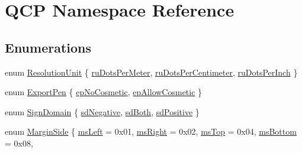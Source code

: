 \hypertarget{namespace_q_c_p}{}\section{Q\+CP Namespace Reference}
\label{namespace_q_c_p}
\subsection*{Enumerations}
\begin{DoxyCompactItemize}
\item 
enum \mbox{\hyperlink{namespace_q_c_p_a715d46153da230990aa887d0f0602452}{Resolution\+Unit}} \{ \mbox{\hyperlink{namespace_q_c_p_a715d46153da230990aa887d0f0602452a707d005dea5c4ab694e4270d9c6094e8}{ru\+Dots\+Per\+Meter}}, 
\mbox{\hyperlink{namespace_q_c_p_a715d46153da230990aa887d0f0602452a4224e01f49b331489ad8cb12b619b229}{ru\+Dots\+Per\+Centimeter}}, 
\mbox{\hyperlink{namespace_q_c_p_a715d46153da230990aa887d0f0602452affb887d8efe79c39a1aca2acd7002afc}{ru\+Dots\+Per\+Inch}}
 \}
\item 
enum \mbox{\hyperlink{namespace_q_c_p_a17844f19e1019693a953e1eb93536d2f}{Export\+Pen}} \{ \mbox{\hyperlink{namespace_q_c_p_a17844f19e1019693a953e1eb93536d2faae8fcfaafee234ce18558afef83f6a78}{ep\+No\+Cosmetic}}, 
\mbox{\hyperlink{namespace_q_c_p_a17844f19e1019693a953e1eb93536d2fa50d3657dba3fb90560b93a823cb0a6e8}{ep\+Allow\+Cosmetic}}
 \}
\item 
enum \mbox{\hyperlink{namespace_q_c_p_afd50e7cf431af385614987d8553ff8a9}{Sign\+Domain}} \{ \mbox{\hyperlink{namespace_q_c_p_afd50e7cf431af385614987d8553ff8a9a2d18af0bc58f6528d1e82ce699fe4829}{sd\+Negative}}, 
\mbox{\hyperlink{namespace_q_c_p_afd50e7cf431af385614987d8553ff8a9aa38352ef02d51ddfa4399d9551566e24}{sd\+Both}}, 
\mbox{\hyperlink{namespace_q_c_p_afd50e7cf431af385614987d8553ff8a9a584784b75fb816abcc627cf743bb699f}{sd\+Positive}}
 \}
\item 
enum \mbox{\hyperlink{namespace_q_c_p_a7e487e3e2ccb62ab7771065bab7cae54}{Margin\+Side}} \{ \newline
\mbox{\hyperlink{namespace_q_c_p_a7e487e3e2ccb62ab7771065bab7cae54a9500c8bfcc9e80b9dff0a8e00e867f07}{ms\+Left}} = 0x01, 
\mbox{\hyperlink{namespace_q_c_p_a7e487e3e2ccb62ab7771065bab7cae54a93c719593bb2b94ed244d52c86d83b65}{ms\+Right}} = 0x02, 
\mbox{\hyperlink{namespace_q_c_p_a7e487e3e2ccb62ab7771065bab7cae54a5db8fb0d0b0ecf0d611c2602a348e8a0}{ms\+Top}} = 0x04, 
\mbox{\hyperlink{namespace_q_c_p_a7e487e3e2ccb62ab7771065bab7cae54a5241d8eac2bab9524a38889f576179cc}{ms\+Bottom}} = 0x08, 

\end{DoxyCompactItemize}
